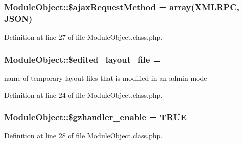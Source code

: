 \subsubsection[{\texorpdfstring{\$ajax\+Request\+Method}{$ajaxRequestMethod}}]{\setlength{\rightskip}{0pt plus 5cm}Module\+Object\+::\$ajax\+Request\+Method = array(\textquotesingle{}X\+M\+L\+R\+PC\textquotesingle{}, \textquotesingle{}J\+S\+ON\textquotesingle{})}\hypertarget{classModuleObject_a783d38cb68310dc6e5a1f6c1cc6c6b84}{}\label{classModuleObject_a783d38cb68310dc6e5a1f6c1cc6c6b84}


Definition at line 27 of file Module\+Object.\+class.\+php.

\subsubsection[{\texorpdfstring{\$edited\+\_\+layout\+\_\+file}{$edited_layout_file}}]{\setlength{\rightskip}{0pt plus 5cm}Module\+Object\+::\$edited\+\_\+layout\+\_\+file = \textquotesingle{}\textquotesingle{}}\hypertarget{classModuleObject_a1fcbb01c627ce5ff104c05f54715bd61}{}\label{classModuleObject_a1fcbb01c627ce5ff104c05f54715bd61}


name of temporary layout files that is modified in an admin mode 



Definition at line 24 of file Module\+Object.\+class.\+php.

\subsubsection[{\texorpdfstring{\$gzhandler\+\_\+enable}{$gzhandler_enable}}]{\setlength{\rightskip}{0pt plus 5cm}Module\+Object\+::\$gzhandler\+\_\+enable = T\+R\+UE}\hypertarget{classModuleObject_acda88247a161a0ddf878e8f504909329}{}\label{classModuleObject_acda88247a161a0ddf878e8f504909329}


Definition at line 28 of file Module\+Object.\+class.\+php.

